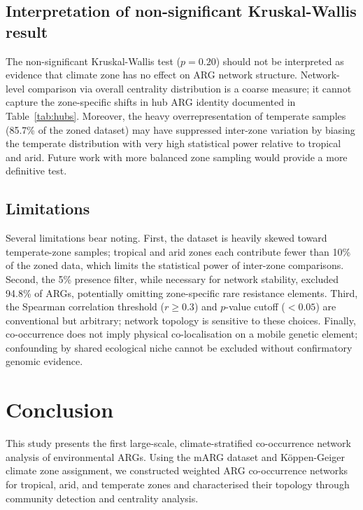 \documentclass[12pt,a4paper]{article}
\begin{document}
\subsection{Interpretation of non-significant Kruskal-Wallis result}

The non-significant Kruskal-Wallis test ($p = 0.20$) should not be
interpreted as evidence that climate zone has no effect on ARG
network structure.
Network-level comparison via overall centrality distribution is a
coarse measure; it cannot capture the zone-specific shifts in hub ARG
identity documented in Table~\ref{tab:hubs}.
Moreover, the heavy overrepresentation of temperate samples
(85.7\% of the zoned dataset) may have suppressed inter-zone variation
by biasing the temperate distribution with very high statistical power
relative to tropical and arid.
Future work with more balanced zone sampling would provide a more
definitive test.

\subsection{Limitations}

Several limitations bear noting.
First, the dataset is heavily skewed toward temperate-zone samples;
tropical and arid zones each contribute fewer than 10\% of the zoned
data, which limits the statistical power of inter-zone comparisons.
Second, the 5\% presence filter, while necessary for network
stability, excluded 94.8\% of ARGs, potentially omitting
zone-specific rare resistance elements.
Third, the Spearman correlation threshold ($r \geq 0.3$) and
$p$-value cutoff ($< 0.05$) are conventional but arbitrary; network
topology is sensitive to these choices.
Finally, co-occurrence does not imply physical co-localisation on
a mobile genetic element; confounding by shared ecological niche
cannot be excluded without confirmatory genomic evidence.


\section{Conclusion}\label{conclusion}

This study presents the first large-scale, climate-stratified
co-occurrence network analysis of environmental ARGs.
Using the mARG dataset and K{\"o}ppen-Geiger climate zone assignment,
we constructed weighted ARG co-occurrence networks for tropical, arid,
and temperate zones and characterised their topology through community
detection and centrality analysis.
\end{document}
